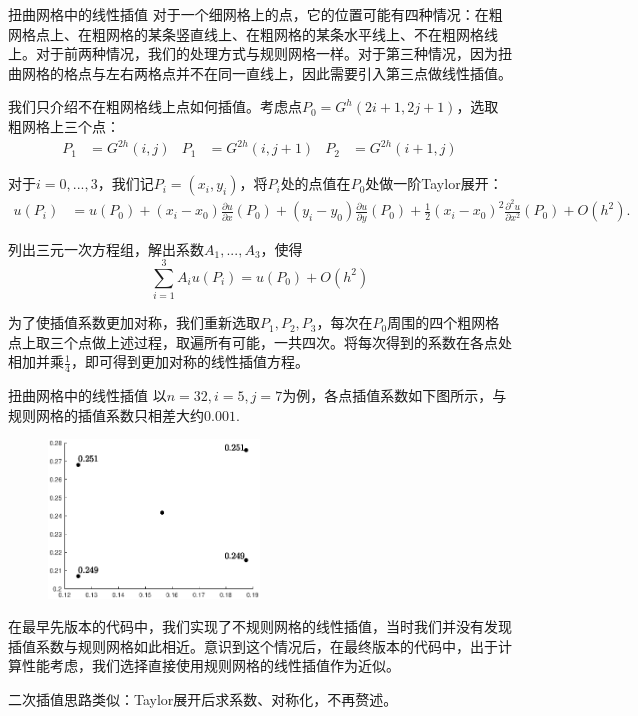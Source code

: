 \documentclass[9pt]{beamer}
\begin{document}
\begin{frame}{扭曲网格中的线性插值}
\small
对于一个细网格上的点，它的位置可能有四种情况：在粗网格点上、在粗网格的某条竖直线上、在粗网格的某条水平线上、不在粗网格线上。对于前两种情况，我们的处理方式与规则网格一样。对于第三种情况，因为扭曲网格的格点与左右两格点并不在同一直线上，因此需要引入第三点做线性插值。

\pause
我们只介绍不在粗网格线上点如何插值。考虑点$P_0=G^h(2i+1,2j+1)$，选取粗网格上三个点：
\begin{align*}
  P_1&=G^{2h}(i,j) & P_1&=G^{2h}(i,j+1) & P_2&=G^{2h}(i+1,j)
\end{align*}

\pause
对于$i=0,...,3$，我们记$P_i=(x_i,y_i)$，将$P_i$处的点值在$P_0$处做一阶Taylor展开：
\begin{align*}
  u(P_i)&=u(P_0)+(x_i-x_0)\frac{\partial u}{\partial x}(P_0)+(y_i-y_0)\frac{\partial u}{\partial y}(P_0)
  +\frac{1}{2}(x_i-x_0)^2\frac{\partial^2 u}{\partial x^2}(P_0) + O(h^2).
\end{align*}

\pause
列出三元一次方程组，解出系数$A_1,...,A_3$，使得
\begin{equation*}
  \sum_{i=1}^3 A_iu(P_i)=u(P_0)+O(h^2)
\end{equation*}

为了使插值系数更加对称，我们重新选取$P_1,P_2,P_3$，每次在$P_0$周围的四个粗网格点上取三个点做上述过程，取遍所有可能，一共四次。将每次得到的系数在各点处相加并乘$\frac{1}{4}$，即可得到更加对称的线性插值方程。
\end{frame}

\begin{frame}{扭曲网格中的线性插值}
以$n=32,i=5,j=7$为例，各点插值系数如下图所示，与规则网格的插值系数只相差大约$0.001$.
\begin{figure}[H]
  \centering
  \includegraphics[width=0.5\textwidth]{../report/figure/3-5.eps}
\end{figure}

\pause
在最早先版本的代码中，我们实现了不规则网格的线性插值，当时我们并没有发现插值系数与规则网格如此相近。意识到这个情况后，在最终版本的代码中，出于计算性能考虑，我们选择直接使用规则网格的线性插值作为近似。

\pause
\vspace{1em}
二次插值思路类似：Taylor展开后求系数、对称化，不再赘述。
\end{frame}
\end{document}
